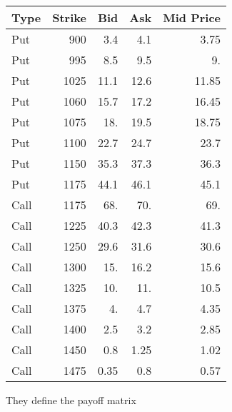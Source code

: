 \documentclass{article}
\begin{document}
\begin{tabular}{lrrrr}
    \toprule
    Type & Strike & Bid  & Ask  & Mid Price \\
    \midrule
    Put  & 900    & 3.4  & 4.1  & 3.75      \\
    Put  & 995    & 8.5  & 9.5  & 9.        \\
    Put  & 1025   & 11.1 & 12.6 & 11.85     \\
    Put  & 1060   & 15.7 & 17.2 & 16.45     \\
    Put  & 1075   & 18.  & 19.5 & 18.75     \\
    Put  & 1100   & 22.7 & 24.7 & 23.7      \\
    Put  & 1150   & 35.3 & 37.3 & 36.3      \\
    Put  & 1175   & 44.1 & 46.1 & 45.1      \\
    Call & 1175   & 68.  & 70.  & 69.       \\
    Call & 1225   & 40.3 & 42.3 & 41.3      \\
    Call & 1250   & 29.6 & 31.6 & 30.6      \\
    Call & 1300   & 15.  & 16.2 & 15.6      \\
    Call & 1325   & 10.  & 11.  & 10.5      \\
    Call & 1375   & 4.   & 4.7  & 4.35      \\
    Call & 1400   & 2.5  & 3.2  & 2.85      \\
    Call & 1450   & 0.8  & 1.25 & 1.02      \\
    Call & 1475   & 0.35 & 0.8  & 0.57      \\
    \bottomrule
\end{tabular}

They define the payoff matrix
\end{document}
